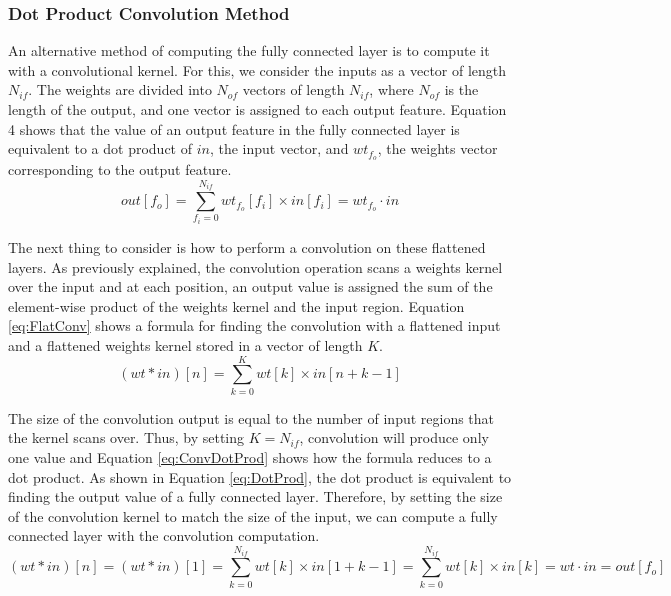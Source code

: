 \documentclass[12pt]{article}
\begin{document}
\subsubsection{Dot Product Convolution Method}
\label{sec:Design-FC-Conv}

An alternative method of computing the fully connected layer is to compute it with a convolutional kernel. For this, we consider the inputs as a vector of length $N_{if}$. The weights are divided into $N_{of}$ vectors of length $N_{if}$, where $N_{of}$ is the length of the output, and one vector is assigned to each output feature. Equation 4 shows that the value of an output feature in the fully connected layer is equivalent to a dot product of $in$, the input vector, and $wt_{f_o}$, the weights vector corresponding to the output feature. 
\begin{equation}
out[f_o] = \sum^{N_{if}}_{f_i=0} wt_{f_o}[f_i]\times in[f_i] = wt_{f_o} \cdot in
\label{eq:DotProd}
\end{equation}

The next thing to consider is how to perform a convolution on these flattened layers. As previously explained, the convolution operation scans a weights kernel over the input and at each position, an output value is assigned the sum of the element-wise product of the weights kernel and the input region. Equation \ref{eq:FlatConv} shows a formula for finding the convolution with a flattened input and a flattened weights kernel stored in a vector of length $K$.
\begin{equation}
(wt*in)[n] = \sum^{K}_{k=0} wt[k]\times in[n + k - 1]
\label{eq:FlatConv}
\end{equation}

The size of the convolution output is equal to the number of input regions that the kernel scans over. Thus, by setting $K = N_{if}$, convolution will produce only one value and Equation \ref{eq:ConvDotProd} shows how the formula reduces to a dot product\cite{fc2conv}. As shown in Equation \ref{eq:DotProd}, the dot product is equivalent to finding the output value of a fully connected layer. Therefore, by setting the size of the convolution kernel to match the size of the input, we can compute a fully connected layer with the convolution computation.
\begin{equation}
(wt*in)[n] = (wt*in)[1] = \sum^{N_{if}}_{k=0} wt[k]\times in[1 + k - 1] 
= \sum^{N_{if}}_{k=0} wt[k]\times in[k] = wt \cdot in = out[f_o]
\label{eq:ConvDotProd}
\end{equation}
\end{document}

